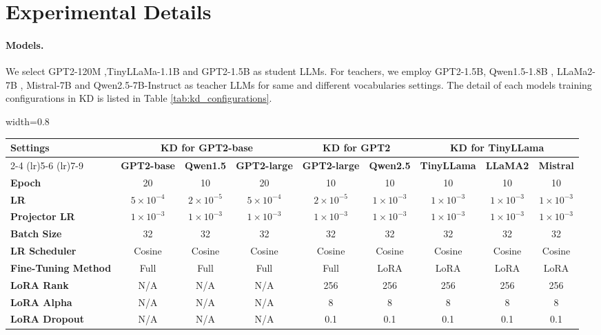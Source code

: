 \section{Experimental Details}

\paragraph{Models.} We select GPT2-120M \cite{radford2019language},TinyLLaMa-1.1B \cite{zhang2024tinyllama} and GPT2-1.5B as student LLMs. For teachers, we employ GPT2-1.5B, Qwen1.5-1.8B \cite{bai2023qwen}, LLaMa2-7B \cite{touvron2023llama}, Mistral-7B \cite{jiang2023mistral} and Qwen2.5-7B-Instruct \cite{yang2024qwen2}
as teacher LLMs for same and different vocabularies settings. The detail of each models training configurations in KD is listed in Table \ref{tab:kd_configurations}.

\begin{table*}[!ht]
\centering
\begin{adjustbox}{width=0.8\textwidth}
\begin{tabular}{lccc cc ccc}
\toprule
\textbf{Settings} 
    & \multicolumn{3}{c}{\textbf{KD for GPT2-base}} 
    & \multicolumn{2}{c}{\textbf{KD for GPT2}} 
    & \multicolumn{3}{c}{\textbf{KD for TinyLLama}} \\
\cmidrule(lr){2-4} \cmidrule(lr){5-6} \cmidrule(lr){7-9}
    & \textbf{GPT2-base} & \textbf{Qwen1.5} & \textbf{GPT2-large} 
    & \textbf{GPT2-large} & \textbf{Qwen2.5} 
    & \textbf{TinyLLama} & \textbf{LLaMA2} & \textbf{Mistral} \\
\midrule
\textbf{Epoch} 
    & 20 & 10 & 20 
    & 10 & 10 
    & 10 & 10 & 10 \\
\textbf{LR} 
    & $5\times10^{-4}$ & $2\times10^{-5}$ & $5\times10^{-4}$ 
    & $2\times10^{-5}$ & $1\times10^{-3}$ 
    & $1\times10^{-3}$ & $1\times10^{-3}$ & $1\times10^{-3}$ \\
\textbf{Projector LR} 
    & $1\times10^{-3}$ & $1\times10^{-3}$ & $1\times10^{-3}$ 
    & $1\times10^{-3}$ & $1\times10^{-3}$ 
    & $1\times10^{-3}$ & $1\times10^{-3}$ & $1\times10^{-3}$ \\
\textbf{Batch Size} 
    & 32 & 32 & 32 
    & 32 & 32 
    & 32 & 32 & 32 \\
\textbf{LR Scheduler} 
    & Cosine & Cosine & Cosine 
    & Cosine & Cosine 
    & Cosine & Cosine & Cosine \\
\textbf{Fine-Tuning Method} 
    & Full & Full & Full 
    & Full & LoRA 
    & LoRA & LoRA & LoRA \\
\textbf{LoRA Rank} 
    & N/A & N/A & N/A 
    & 256 & 256 
    & 256 & 256 & 256 \\
\textbf{LoRA Alpha} 
    & N/A & N/A & N/A 
    & 8 & 8 
    & 8 & 8 & 8 \\
\textbf{LoRA Dropout} 
    & N/A & N/A & N/A 
    & 0.1 & 0.1 
    & 0.1 & 0.1 & 0.1 \\
\bottomrule
\end{tabular}
\end{adjustbox}
\caption{Detailed training configurations}
\label{tab:kd_configurations}
\end{table*}

